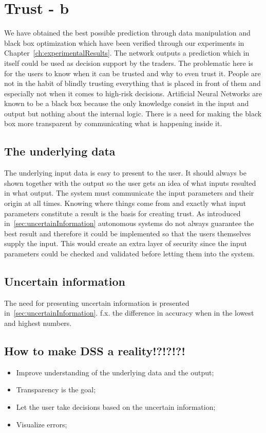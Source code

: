 \section{Trust - b}
We have obtained the best possible prediction through data manipulation and black box optimization which have been verified through our experiments in Chapter~\ref{ch:experimentalResults}. The network outputs a prediction which in itself could be used as decision support by the traders. The problematic here is for the users to know when it can be trusted and why to even trust it. People are not in the habit of blindly trusting everything that is placed in front of them and especially not when it comes to high-risk decisions. 
Artificial Neural Networks are known to be a black box \cite{fromBlackBoxToTransparentBox} because the only knowledge consist in the input and output but nothing about the internal logic. There is a need for making the black box more transparent by communicating what is happening inside it.


\subsection{The underlying data}
The underlying input data is easy to present to the user. It should always be shown together with the output so the user gets an idea of what inputs resulted in what output. The system must communicate the input parameters and their origin at all times. Knowing where things come from and exactly what input parameters constitute a result is the basis for creating trust. As introduced in~\ref{sec:uncertainInformation} autonomous systems do not always guarantee the best result and therefore it could be implemented so that the users themselves supply the input. This would create an extra layer of security since the input parameters could be checked and validated before letting them into the system. 


\subsection{Uncertain information}
The need for presenting uncertain information is presented in~\ref{sec:uncertainInformation}.
f.x. the difference in accuracy when in the lowest and highest numbers.

\subsection{How to make DSS a reality!?!?!?!}
\begin{itemize}
\item Improve understanding of the underlying data and the output;
\item Transparency is the goal;
\item Let the user take decisions based on the uncertain information;
\item Visualize errors;
\end{itemize}
